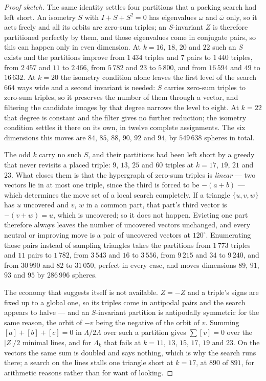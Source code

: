 \documentclass[11pt]{amsart}
\theoremstyle{remark}
\begin{document}
\begin{proof}[Proof sketch]
The same identity settles four partitions that a packing search had left short. An isometry
$S$ with $I+S+S^2=0$ has eigenvalues $\omega$ and $\bar\omega$ only, so it acts freely and
all its orbits are zero-sum triples; an $S$-invariant $Z$ is therefore partitioned perfectly
by them, and those eigenvalues come in conjugate pairs, so this can happen only in even
dimension. At $k=16$, $18$, $20$ and $22$ such an $S$ exists and the partitions improve
from $1\,434$ triples and $7$ pairs to $1\,440$ triples, from $2\,457$ and $11$ to $2\,466$,
from $5\,782$ and $23$ to $5\,800$, and from $16\,594$ and $49$ to $16\,632$. At
$k=20$ the isometry condition alone leaves the first level of the search $664$ ways
wide and a second invariant is needed: $S$ carries zero-sum triples to zero-sum triples,
so it preserves the number of them through a vector, and filtering the candidate images by
that degree narrows the level to eight. At $k=22$ that degree is constant and the filter
gives no further reduction; the isometry condition settles it there on its own, in twelve complete
assignments. The six dimensions this moves are $84$, $85$, $88$, $90$, $92$ and $94$, by
$549\,638$ spheres in total.

The odd $k$ carry no such $S$, and their partitions had been left short by a greedy that
never revisits a placed triple: $9$, $13$, $25$ and $60$ triples at $k=17$, $19$, $21$ and
$23$. What closes them is that the hypergraph of zero-sum triples is \emph{linear} --- two
vectors lie in at most one triple, since the third is forced to be $-(a+b)$ --- which
determines the move set of a local search completely. If a triangle $\{u,v,w\}$ has $u$
uncovered and $v$, $w$ in a common part, that part's third vector is $-(v+w)=u$, which is
uncovered; so it does not happen. Evicting one part therefore always leaves the number of
uncovered vectors unchanged, and every neutral or improving move is a pair of uncovered
vectors at $120^\circ$. Enumerating those pairs instead of sampling triangles takes the
partitions from $1\,773$ triples and $11$ pairs to $1\,782$, from $3\,543$ and $16$ to
$3\,556$, from $9\,215$ and $34$ to $9\,240$, and from $30\,990$ and $82$ to $31\,050$,
perfect in every case, and moves dimensions $89$, $91$, $93$ and $95$ by $286\,996$
spheres.

The economy that suggests itself is not available. $Z=-Z$ and a triple's signs are fixed up to
a global one, so its triples come in antipodal pairs and the search appears to halve --- and
an $S$-invariant partition is antipodally symmetric for the same reason, the orbit of $-v$
being the negative of the orbit of $v$. Summing $[a]+[b]+[c]=0$ in $\Lambda/2\Lambda$ over
such a partition gives $\sum[v]=0$ over the $|Z|/2$ minimal lines, and for $\Lambda_k$ that
fails at $k=11$, $13$, $15$, $17$, $19$ and $23$. On the vectors the same sum is doubled and
says nothing, which is why the search runs there; a search on the lines stalls one triangle
short at $k=17$, at $890$ of $891$, for arithmetic reasons rather than for want of looking.


\end{proof}
\end{document}
